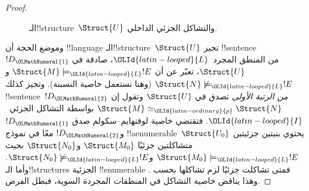 \documentclass[../../../include/open-logic-section]{subfiles}
\begin{document}
\begin{proof}
\begin{figure}[h]
  \centering
  \caption{الـ!!{structure}~$\Struct{U}$ والتشاكل الجزئي الداخلي.}
\end{figure}

وموضع الحجة أن !!{language} الـ!!{structure}~$\Struct{U}$
تجيز !!{sentence}~$!D_\OLMathNumeral{1}$ من المنطق المجرد~$\OLId{latin-looped}{L}$، صادقة في $\Struct{U}$، تعبّر عن أن
$\Struct{M} \models_\OLId{latin-looped}{L} !E$ و$\Struct{N} \not\models_\OLId{latin-looped}{L} !E$ (وهنا نستعمل
خاصية النسبنة). وتجيز كذلك !!{sentence}~$!D_\OLMathNumeral{2}$ \emph{من الرتبة الأولى}
تصدق في $\Struct{U}$ وتقول إن $\Struct{M} \simeq_\OLId{latin-ordinary}{p} \Struct{N}$ بواسطة
التشاكل الجزئي~$\OLId{latin-looped}{I}$. فتقتضي خاصية لوفنهايم--سكولم صدق $!D_\OLMathNumeral{1}$ و$!D_\OLMathNumeral{2}$ معًا
في نموذج !!a{enumerable}~$\Struct{U_0}$ يحتوي بنيتين جزئيتين متشاكلتين
جزئيًا $\Struct{M_0}$ و$\Struct{N_0}$ بحيث
$\Struct{M_0} \models_\OLId{latin-looped}{L} !E$ و$\Struct{N_0} \not\models_\OLId{latin-looped}{L} !E$. وأما
الـ!!{structure}s الجزئية !!{enumerable} فمتى تشاكلت جزئيًا لزم تشاكلها
بحسب . وهذا يناقض خاصية التشاكل في المنطقات
المجردة السوية، فبطل الفرض.
\end{proof}
\end{document}
